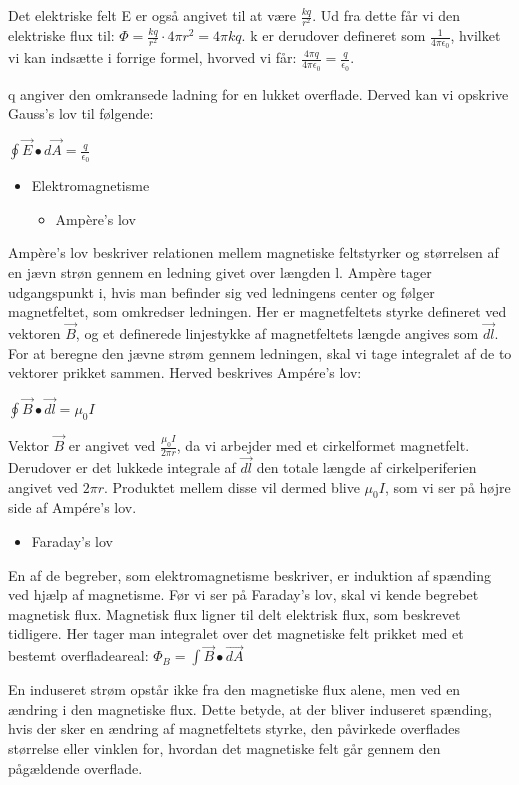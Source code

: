 Det elektriske felt E er også angivet til at være $\frac{kq}{r^2}$. Ud fra dette får vi den elektriske flux til: $\Phi = \frac{kq}{r^2} \cdot 4 \pi r^2 = 4 \pi k q$. k er derudover defineret som $\frac{1}{4 \pi \epsilon_0}$, hvilket vi kan indsætte i forrige formel, hvorved vi får: $\frac{4 \pi q}{4 \pi \epsilon_0} = \frac{q}{\epsilon_0}$.

q angiver den omkransede ladning for en lukket overflade. Derved kan vi opskrive Gauss's lov til følgende:

\centerline{$\oint \vec{E} \bullet d \vec{A} = \frac{q}{\epsilon_0}$}

\begin{itemize}
\item Elektromagnetisme
\begin{itemize}
\item Ampère's lov
\end{itemize}
\end{itemize}
Ampère's lov beskriver relationen mellem magnetiske feltstyrker og størrelsen af en jævn strøn gennem en ledning givet over længden l. Ampère tager udgangspunkt i, hvis man befinder sig ved ledningens center og følger magnetfeltet, som omkredser ledningen. Her er magnetfeltets styrke defineret ved vektoren $\vec{B}$, og et definerede linjestykke af magnetfeltets længde angives som $\vec{dl}$. For at beregne den jævne strøm gennem ledningen, skal vi tage integralet af de to vektorer prikket sammen. Herved beskrives Ampére's lov:

\centerline{$\oint \vec{B} \bullet \vec{dl} = \mu_0 I$}

Vektor $\vec{B}$ er angivet ved $\frac{\mu_0 I}{2 \pi r}$, da vi arbejder med et cirkelformet magnetfelt. Derudover er det lukkede integrale af $\vec{dl}$ den totale længde af cirkelperiferien angivet ved $2 \pi r$. Produktet mellem disse vil dermed blive $\mu_0 I$, som vi ser på højre side af Ampére's lov.


\begin{itemize}
\item Faraday's lov
\end{itemize}
En af de begreber, som elektromagnetisme beskriver, er induktion af spænding ved hjælp af magnetisme. Før vi ser på Faraday's lov, skal vi kende begrebet magnetisk flux. Magnetisk flux ligner til delt elektrisk flux, som beskrevet tidligere. Her tager man integralet over det magnetiske felt prikket med et bestemt overfladeareal: $\Phi_B = \int \vec{B} \bullet \vec{dA}$

En induseret strøm opstår ikke fra den magnetiske flux alene, men ved en ændring i den magnetiske flux. Dette betyde, at der bliver induseret spænding, hvis der sker en ændring af magnetfeltets styrke, den påvirkede overflades størrelse eller vinklen for, hvordan det magnetiske felt går gennem den pågældende overflade.

